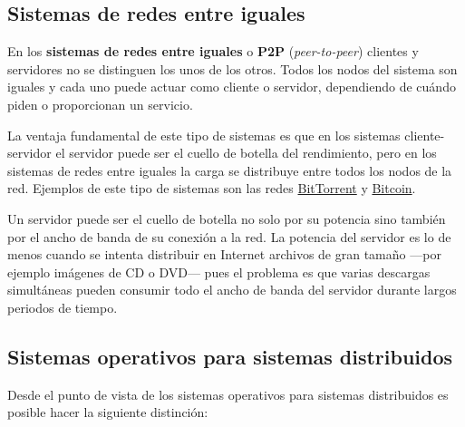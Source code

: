 \subsection{Sistemas de redes entre
iguales}\label{_sistemas_de_redes_entre_iguales}

En los \textbf{sistemas de redes entre iguales} {} {} o \textbf{{}P2P}
(\emph{peer-to-peer}) clientes y servidores no se distinguen los unos de
los otros. Todos los nodos del sistema son iguales y cada uno puede
actuar como cliente o servidor, dependiendo de cuándo piden o
proporcionan un servicio.

La ventaja fundamental de este tipo de sistemas es que en los sistemas
cliente-servidor el servidor puede ser el cuello de botella del
rendimiento, pero en los sistemas de redes entre iguales la carga se
distribuye entre todos los nodos de la red. Ejemplos de este tipo de
sistemas son las redes
\href{https://es.wikipedia.org/wiki/BitTorrent}{BitTorrent} y
\href{https://es.wikipedia.org/wiki/Bitcoin}{Bitcoin}.

Un servidor puede ser el cuello de botella no solo por su potencia sino
también por el ancho de banda de su conexión a la red. La potencia del
servidor es lo de menos cuando se intenta distribuir en Internet
archivos de gran tamaño ---por ejemplo imágenes de CD o DVD--- pues el
problema es que varias descargas simultáneas pueden consumir todo el
ancho de banda del servidor durante largos periodos de tiempo.

\subsection{Sistemas operativos para sistemas
distribuidos}\label{_sistemas_operativos_para_sistemas_distribuidos}

Desde el punto de vista de los sistemas operativos para sistemas
distribuidos es posible hacer la siguiente distinción:

